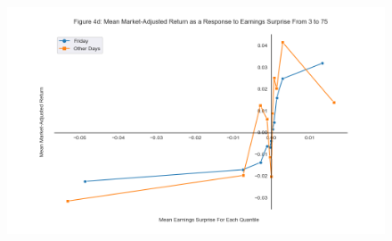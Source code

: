 \documentclass[11pt]{article}
\begin{document}
\begin{figure}[H] 
    \centering
    \includegraphics[width=.8\textwidth]{fig4d.png}
\end{figure}
\end{document}
